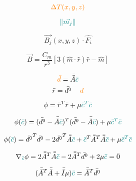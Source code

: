 \begin{equation}
    \textcolor{orange}{\Delta T (x, y, z)}
\end{equation}

\begin{equation}
  \textcolor{teal}{\left\lVert \vec{m_j} \right\rVert}  
\end{equation}

\begin{equation}
    \vec{B_j}(x, y, z) \cdot \hat{F_i}
\end{equation}

\begin{equation}
    \vec{B} = \frac{C_m}{r^3} [3 ( \hat{m} \cdot \hat{r}) \hat{r} - \hat{m}]
\end{equation}

\begin{equation}
    \textcolor{orange}{\Bar{d}} = \Bar{\Bar{A}} \textcolor{teal}{\Bar{c}}
\end{equation}
\begin{equation}
    \bar{r} = \bar{d^0} - \textcolor{orange}{\bar{d}}
\end{equation}

\begin{equation}
    \phi = \bar{r}^T\bar{r} + \mu \textcolor{teal}{\bar{c}^T\bar{c}}
\end{equation}

\begin{equation}
    \phi (\textcolor{teal}{\bar{c}}) = (\bar{d^0} - \Bar{\Bar{A}} \textcolor{teal}{\Bar{c}})^T (\bar{d^0} - \Bar{\Bar{A}} \textcolor{teal}{\Bar{c}}) + \mu \textcolor{teal}{\bar{c}^T\bar{c}}
\end{equation}

\begin{equation}
    \phi (\textcolor{teal}{\bar{c}}) = \bar{d^0}^T\bar{d^0} - 2 \bar{d^0}^T \Bar{\Bar{A}} \textcolor{teal}{\Bar{c}} + \textcolor{teal}{\Bar{c}}^T \Bar{\Bar{A}}^T \Bar{\Bar{A}} \textcolor{teal}{\Bar{c}} + \mu \textcolor{teal}{\bar{c}^T\bar{c}}
\end{equation}

\begin{equation}
    \nabla_{\textcolor{teal}{\bar{c}}} \phi = 2 \Bar{\Bar{A}}^T \Bar{\Bar{A}} \textcolor{teal}{\Bar{c}} - 2\Bar{\Bar{A}}^T\bar{d^0} + 2\mu \textcolor{teal}{\bar{c}} = \bar{0}
\end{equation}
    
\begin{equation}
    (\Bar{\Bar{A}}^T \Bar{\Bar{A}} + \Bar{\Bar{I}} \mu ) \textcolor{teal}{\bar{c}} = 
    \Bar{\Bar{A}}^T\bar{d^0}
\end{equation}

